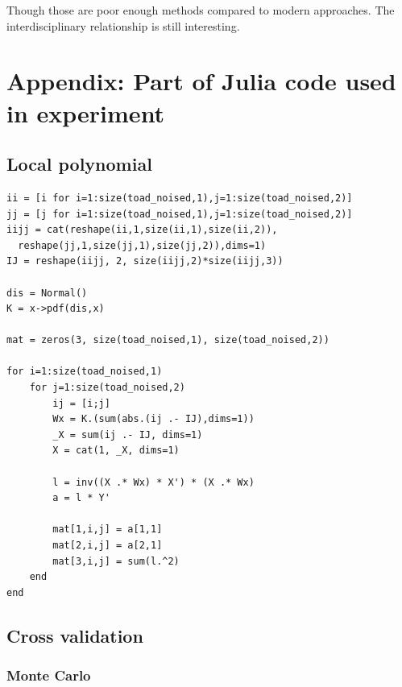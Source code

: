 \documentclass{article}
\begin{document}
Though those are poor enough methods compared to modern approaches. The interdisciplinary relationship is still interesting. 


  

\newpage

\appendix

\section{Appendix: Part of Julia code used in experiment}



\subsection{Local polynomial}

\begin{lstlisting}
ii = [i for i=1:size(toad_noised,1),j=1:size(toad_noised,2)] 
jj = [j for i=1:size(toad_noised,1),j=1:size(toad_noised,2)] 
iijj = cat(reshape(ii,1,size(ii,1),size(ii,2)),
  reshape(jj,1,size(jj,1),size(jj,2)),dims=1)
IJ = reshape(iijj, 2, size(iijj,2)*size(iijj,3))

dis = Normal()
K = x->pdf(dis,x)

mat = zeros(3, size(toad_noised,1), size(toad_noised,2))

for i=1:size(toad_noised,1)
    for j=1:size(toad_noised,2)
        ij = [i;j]
        Wx = K.(sum(abs.(ij .- IJ),dims=1))
        _X = sum(ij .- IJ, dims=1)
        X = cat(1, _X, dims=1)

        l = inv((X .* Wx) * X') * (X .* Wx)
        a = l * Y'

        mat[1,i,j] = a[1,1]
        mat[2,i,j] = a[2,1]
        mat[3,i,j] = sum(l.^2)
    end
end
\end{lstlisting}

\subsection{Cross validation}

\subsubsection{Monte Carlo}
\end{document}
